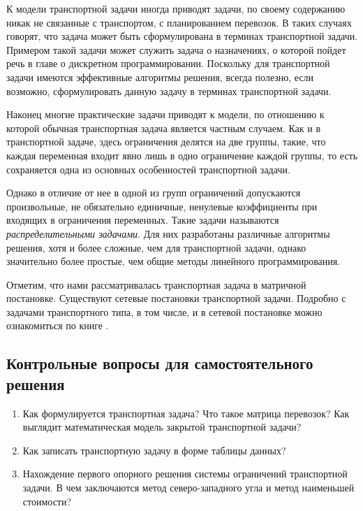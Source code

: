 {К модели транспортной задачи иногда приводят задачи, по своему содержанию никак не связанные с транспортом, с планированием перевозок. В таких случаях говорят, что задача может быть сформулирована в терминах транспортной задачи. Примером такой задачи может служить задача о назначениях, о которой пойдет речь в главе о дискретном программировании. Поскольку для транспортной задачи имеются эффективные алгоритмы решения, всегда полезно, если возможно, сформулировать данную задачу в терминах транспортной задачи.

Наконец многие практические задачи приводят к модели, по отношению к которой обычная транспортная задача является частным случаем. Как и в транспортной задаче, здесь ограничения делятся на две группы, такие, что каждая переменная входит явно лишь в одно ограничение каждой группы, то есть сохраняется одна из основных особенностей транспортной задачи.

Однако в отличие от нее в одной из групп ограничений допускаются произвольные, не обязательно единичные, ненулевые коэффициенты при входящих в ограничения переменных. Такие задачи называются \textit{распределительными задачами}. Для них разработаны различные алгоритмы решения, хотя и более сложные, чем для транспортной задачи, однако значительно более простые, чем общие методы линейного программирования.

Отметим, что нами рассматривалась транспортная задача в матричной постановке. Существуют сетевые постановки транспортной задачи. Подробно с задачами транспортного типа, в том числе, и в сетевой постановке можно ознакомиться по книге \cite{literature_golshtein_1}.

\subsection*{Контрольные вопросы для самостоятельного решения}

\begin{enumerate}
\item \textbf{ }Как формулируется транспортная задача? Что такое матрица перевозок? Как выглядит математическая модель закрытой транспортной задачи?

\item  Как записать транспортную задачу в форме таблицы данных?

\item  Нахождение первого опорного решения системы ограничений транспортной задачи. В чем заключаются метод северо-западного угла и метод наименьшей стоимости?


\end{enumerate}}
